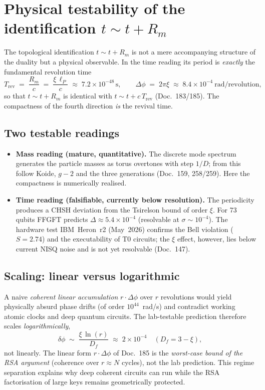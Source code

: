 \section{Physical testability of the identification $t\sim t+R_m$}

The topological identification $t \sim t + R_m$ is not a mere accompanying
structure of the duality but a physical observable. In the time reading its
period is \emph{exactly} the fundamental revolution time
\[
  T_\text{rev} \;=\; \frac{R_m}{c} \;=\; \frac{\xi\,\ell_P}{c}
  \;\approx\; 7.2\times10^{-48}\,\text{s},
  \qquad
  \Delta\phi \;=\; 2\pi\xi \;\approx\; 8.4\times10^{-4}\ \text{rad/revolution},
\]
so that $t\sim t+R_m$ is identical with $t\sim t+c\,T_\text{rev}$ (Doc.~183/185).
The compactness of the fourth direction \emph{is} the revival time.

\subsection{Two testable readings}
\begin{itemize}
  \item \textbf{Mass reading (mature, quantitative).} The discrete mode spectrum
  generates the particle masses as torus overtones with step $1/D$; from this
  follow Koide, $g\!-\!2$ and the three generations (Doc.~159, 258/259). Here the
  compactness is numerically realised.
  \item \textbf{Time reading (falsifiable, currently below resolution).} The
  periodicity produces a CHSH deviation from the Tsirelson bound of order $\xi$.
  For 73 qubits FFGFT predicts $\Delta \approx 5.4\times10^{-4}$ (resolvable at
  $\sigma\sim10^{-4}$). The hardware test IBM~Heron~r2 (May~2026) confirms the
  Bell violation ($S=2.74$) and the executability of T0 circuits; the $\xi$
  effect, however, lies below current NISQ noise and is not yet resolvable
  (Doc.~147).
\end{itemize}

\subsection{Scaling: linear versus logarithmic}

\begin{important}
A naive \emph{coherent linear accumulation} $r\cdot\Delta\phi$ over $r$
revolutions would yield physically absurd phase drifts (of order
$10^{44}$~rad/s) and contradict working atomic clocks and deep quantum circuits.
The lab-testable prediction therefore scales \emph{logarithmically},
\[
  \delta\phi \;\sim\; \frac{\xi\,\ln(r)}{D_f}
  \;\approx\; 2\times10^{-4} \quad (D_f = 3-\xi),
\]
not linearly. The linear form $r\cdot\Delta\phi$ of Doc.~185 is the
\emph{worst-case bound of the RSA argument} (coherence over $r\approx N$ cycles),
not the lab prediction. This regime separation explains why deep coherent
circuits can run while the RSA factorisation of large keys remains geometrically
protected.
\end{important}

